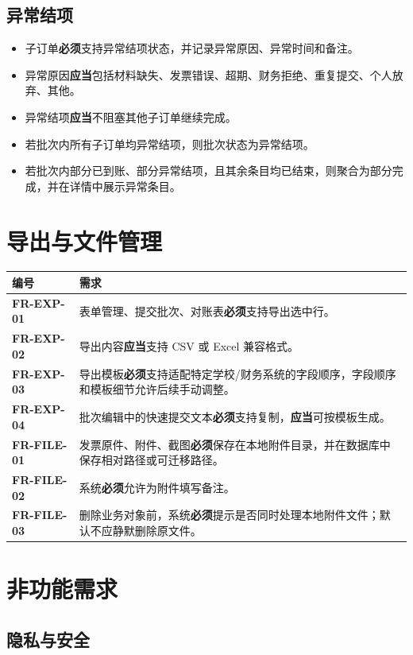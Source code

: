 \documentclass[UTF8,zihao=-4]{ctexart}
\newcommand{\req}[1]{\textbf{\textcolor{ivicBrown}{#1}}}
\newcommand{\must}{\textbf{必须}}
\newcommand{\should}{\textbf{应当}}
\begin{document}
\subsection{异常结项}

\begin{itemize}
  \item 子订单\must{}支持异常结项状态，并记录异常原因、异常时间和备注。
  \item 异常原因\should{}包括材料缺失、发票错误、超期、财务拒绝、重复提交、个人放弃、其他。
  \item 异常结项\should{}不阻塞其他子订单继续完成。
  \item 若批次内所有子订单均异常结项，则批次状态为异常结项。
  \item 若批次内部分已到账、部分异常结项，且其余条目均已结束，则聚合为部分完成，并在详情中展示异常条目。
\end{itemize}

\section{导出与文件管理}

\begin{longtable}{p{2.8cm}p{11.6cm}}
\toprule
编号 & 需求 \\
\midrule
\req{FR-EXP-01} & 表单管理、提交批次、对账表\must{}支持导出选中行。 \\
\req{FR-EXP-02} & 导出内容\should{}支持 CSV 或 Excel 兼容格式。 \\
\req{FR-EXP-03} & 导出模板\must{}支持适配特定学校/财务系统的字段顺序，字段顺序和模板细节允许后续手动调整。 \\
\req{FR-EXP-04} & 批次编辑中的快速提交文本\must{}支持复制，\should{}可按模板生成。 \\
\req{FR-FILE-01} & 发票原件、附件、截图\must{}保存在本地附件目录，并在数据库中保存相对路径或可迁移路径。 \\
\req{FR-FILE-02} & 系统\must{}允许为附件填写备注。 \\
\req{FR-FILE-03} & 删除业务对象前，系统\must{}提示是否同时处理本地附件文件；默认不应静默删除原文件。 \\
\bottomrule
\end{longtable}

\section{非功能需求}

\subsection{隐私与安全}
\end{document}
